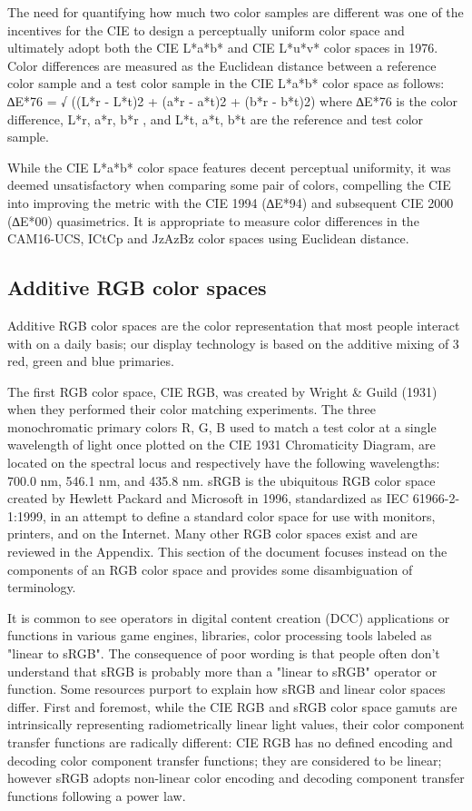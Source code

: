 The need for quantifying how much two color samples are different was one of the incentives for the CIE to design a perceptually uniform color space and ultimately adopt both the CIE L*a*b* and CIE L*u*v* color spaces in 1976. Color differences are measured as the Euclidean distance between a reference color sample and a test color sample in the CIE L*a*b* color space as follows:
∆E*76 = √ ((L*r - L*t)2 + (a*r - a*t)2  + (b*r - b*t)2)
where ∆E*76 is the color difference, L*r, a*r, b*r , and L*t, a*t, b*t are the reference and test color sample. 

While the CIE L*a*b* color space features decent perceptual uniformity, it was deemed unsatisfactory when comparing some pair of colors, compelling the CIE into improving the metric with the CIE 1994 (∆E*94) and subsequent CIE 2000  (∆E*00)  quasimetrics. It is appropriate to measure color differences in the CAM16-UCS, ICtCp and JzAzBz color spaces using Euclidean distance.

\subsection{Additive RGB color spaces}

Additive RGB color spaces are the color representation that most people interact with on a daily basis; our display technology is based on the additive mixing of 3 red, green and blue primaries.

The first RGB color space, CIE RGB, was created by Wright & Guild (1931) when they performed their color matching experiments. The three monochromatic primary colors R, G, B used to match a test color at a single wavelength of light once plotted on the CIE 1931 Chromaticity Diagram, are located on the spectral locus and respectively have the following wavelengths: 700.0 nm, 546.1 nm, and 435.8 nm. sRGB is the ubiquitous RGB color space created by Hewlett Packard and Microsoft in 1996, standardized as IEC 61966-2-1:1999, in an attempt to define a standard color space for use with monitors, printers, and on the Internet. Many other RGB color spaces exist and are reviewed in the Appendix. This section of the document focuses instead on the components of an RGB color space and provides some disambiguation of terminology.

It is common to see operators in digital content creation (DCC) applications or functions in various game engines, libraries, color processing tools labeled as "linear to sRGB". The consequence of poor wording is that people often don't understand that sRGB is probably more than a "linear to sRGB" operator or function. Some resources purport to explain how sRGB and linear color spaces differ.
First and foremost, while the CIE RGB and sRGB color space gamuts are intrinsically representing radiometrically linear light values, their color component transfer functions are radically different: CIE RGB has no defined encoding and decoding color component transfer functions; they are considered to be linear; however sRGB adopts non-linear color encoding and decoding component transfer functions following a power law.

